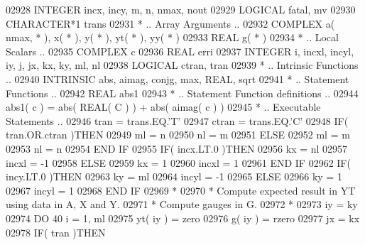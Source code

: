 \begin{DoxyCode}
02928       \textcolor{keywordtype}{INTEGER}            incx, incy, m, n, nmax, nout
02929       \textcolor{keywordtype}{LOGICAL}            fatal, mv
02930       \textcolor{keywordtype}{CHARACTER*1}        trans
02931 \textcolor{comment}{*     .. Array Arguments ..}
02932       \textcolor{keywordtype}{COMPLEX}            a( nmax, * ), x( * ), y( * ), yt( * ), yy( * )
02933       \textcolor{keywordtype}{REAL}               g( * )
02934 \textcolor{comment}{*     .. Local Scalars ..}
02935       \textcolor{keywordtype}{COMPLEX}            c
02936       \textcolor{keywordtype}{REAL}               erri
02937       \textcolor{keywordtype}{INTEGER}            i, incxl, incyl, iy, j, jx, kx, ky, ml, nl
02938       \textcolor{keywordtype}{LOGICAL}            ctran, tran
02939 \textcolor{comment}{*     .. Intrinsic Functions ..}
02940       \textcolor{keywordtype}{INTRINSIC}          abs, aimag, conjg, max, \textcolor{keywordtype}{REAL}, sqrt
02941 \textcolor{comment}{*     .. Statement Functions ..}
02942       \textcolor{keywordtype}{REAL}               abs1
02943 \textcolor{comment}{*     .. Statement Function definitions ..}
02944       abs1( c ) = abs( \textcolor{keywordtype}{REAL( C )} ) + abs( aimag( c ) )
02945 \textcolor{comment}{*     .. Executable Statements ..}
02946       tran = trans.EQ.\textcolor{stringliteral}{'T'}
02947       ctran = trans.EQ.\textcolor{stringliteral}{'C'}
02948       \textcolor{keywordflow}{IF}( tran.OR.ctran )\textcolor{keywordflow}{THEN}
02949          ml = n
02950          nl = m
02951       \textcolor{keywordflow}{ELSE}
02952          ml = m
02953          nl = n
02954 \textcolor{keywordflow}{      END IF}
02955       \textcolor{keywordflow}{IF}( incx.LT.0 )\textcolor{keywordflow}{THEN}
02956          kx = nl
02957          incxl = -1
02958       \textcolor{keywordflow}{ELSE}
02959          kx = 1
02960          incxl = 1
02961 \textcolor{keywordflow}{      END IF}
02962       \textcolor{keywordflow}{IF}( incy.LT.0 )\textcolor{keywordflow}{THEN}
02963          ky = ml
02964          incyl = -1
02965       \textcolor{keywordflow}{ELSE}
02966          ky = 1
02967          incyl = 1
02968 \textcolor{keywordflow}{      END IF}
02969 \textcolor{comment}{*}
02970 \textcolor{comment}{*     Compute expected result in YT using data in A, X and Y.}
02971 \textcolor{comment}{*     Compute gauges in G.}
02972 \textcolor{comment}{*}
02973       iy = ky
02974       \textcolor{keywordflow}{DO} 40 i = 1, ml
02975          yt( iy ) = zero
02976          g( iy ) = rzero
02977          jx = kx
02978          \textcolor{keywordflow}{IF}( tran )\textcolor{keywordflow}{THEN}

\end{DoxyCode}
